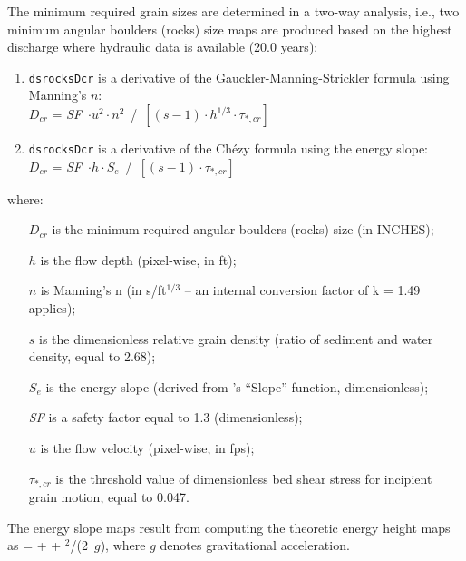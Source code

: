 The minimum required grain sizes are determined in a two-way analysis, i.e., two minimum angular boulders (rocks) size maps are produced based on the highest discharge where hydraulic data is available (20.0 years):
\begin{enumerate}
	\item \texttt{ds{\myUnderscore}rocks{\myUnderscore}Dcr} is a derivative of the Gauckler-Manning-Strickler formula using Manning's $n$:\\
	$D_{cr}$ = \textit{SF}~$\cdot u^2 \cdot n^2$~/~$\left[\left(s - 1\right) \cdot h^{1/3} \cdot \tau_{*,cr} \right]$
	\item \texttt{ds{\myUnderscore}rocks{\myUnderscore}Dcr} is a derivative of the Ch\'ezy formula using the energy slope:\\
	$D_{cr}$ = \textit{SF}~$\cdot h \cdot S_e$~/~$\left[\left(s - 1\right) \cdot \tau_{*,cr} \right]$
\end{enumerate}
where:
\begin{itemize}
	\item[$D_{cr}$] is the minimum required angular boulders (rocks) size (in INCHES);
	\item[$h$] is the flow depth (pixel-wise, in ft);
	\item[$n$] is Manning's n (in s/ft$^{1/3}$ -- an internal conversion factor of k = 1.49 applies);
	\item[$s$] is the dimensionless relative grain density (ratio of sediment and water density, equal to 2.68);
	\item[$S_e$] is the energy slope (derived from 's ``Slope'' function, dimensionless);
	\item[\textit{SF}] is a safety factor equal to 1.3 (dimensionless);
	\item[$u$] is the flow velocity (pixel-wise, in fps);
	\item[$\tau_{*,cr}$] is the threshold value of dimensionless bed shear stress for incipient grain motion, equal to 0.047.
\end{itemize}
The energy slope maps result from computing the theoretic energy height maps as  =  +  + $^2$/(2~$g$), where $g$ denotes gravitational acceleration.

